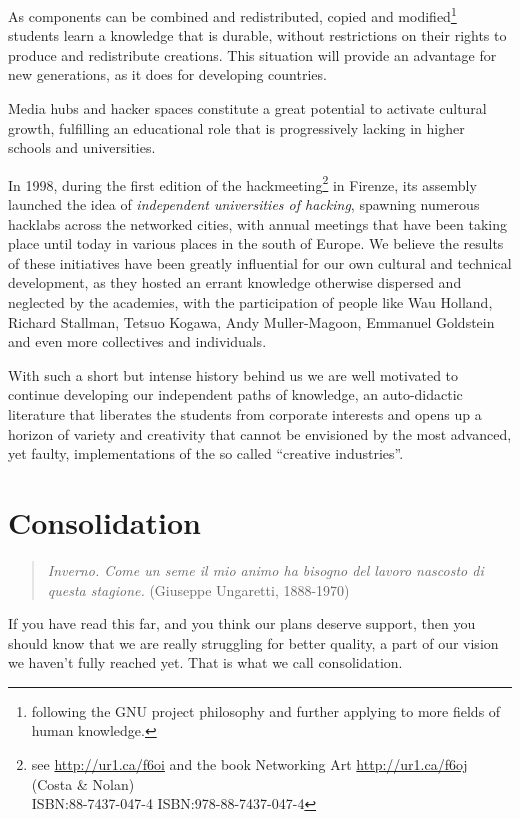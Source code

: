 As components can be combined and redistributed, copied and
modif\hbox{}ied\footnote{following the GNU project philosophy and further
applying to more f\hbox{}ields of human knowledge.} students learn a knowledge
that is durable, without restrictions on their rights to produce and
redistribute creations.  This situation will provide an advantage for new
generations, as it does for developing countries.

Media hubs and hacker spaces constitute a great potential to activate cultural
growth, fulf\hbox{}illing an educational role that is progressively lacking in
higher schools and universities.

In 1998, during the f\hbox{}irst edition of the hackmeeting\footnote{see
\url{http://ur1.ca/f6oi} and the book Networking Art \url{http://ur1.ca/f6oj}
(Costa \& Nolan)\\ ISBN:88-7437-047-4 ISBN:978-88-7437-047-4} in
F\hbox{}irenze, its assembly launched the idea of \textit{independent
universities of hacking}, spawning numerous hacklabs across the networked
cities, with annual meetings that have been taking place until today in various
places in the south of Europe. We believe the results of these initiatives have
been greatly inf\hbox{}luential for our own cultural and technical development,
as they hosted an errant knowledge otherwise dispersed and neglected by the
academies, with the participation of people like Wau Holland, Richard Stallman,
Tetsuo Kogawa, Andy Muller-Magoon, Emmanuel Goldstein and even more collectives
and individuals.

With such a short but intense history behind us we are well motivated to
continue developing our independent paths of knowledge, an auto-didactic
literature that liberates the students from corporate interests and opens up a
horizon of variety and creativity that cannot be envisioned by the most
advanced, yet faulty, implementations of the so called ``creative industries''.


\section{Consolidation}
\label{s:weaver_birds:consolidation}

\begin{quote}
\textit{Inverno. Come un seme il mio animo ha bisogno del lavoro nascosto di
questa stagione.} (Giuseppe Ungaretti, 1888-1970)
\end{quote}

If you have read this far, and you think our plans deserve support, then you
should know that we are really struggling for better quality, a part of our
vision we haven't fully reached yet. That is what we call consolidation.

